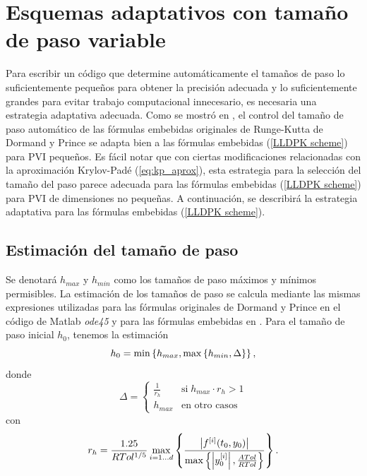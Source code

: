 \section{Esquemas adaptativos con tamaño de paso variable}
Para escribir un código que determine automáticamente el tamaños de paso lo suficientemente pequeños para obtener la precisión adecuada y lo suficientemente grandes para evitar trabajo computacional innecesario, es necesaria una estrategia adaptativa adecuada. Como se mostró en \cite{Jimenez14AMC}, el control del tamaño de paso automático de las fórmulas embebidas originales de Runge-Kutta de Dormand y Prince se adapta bien a las fórmulas embebidas (\ref{LLDPK scheme}) para PVI pequeños. Es fácil notar que con ciertas modificaciones relacionadas con la aproximación Krylov-Padé (\ref{eq:kp_aprox}), esta estrategia para la selección del tamaño del paso parece adecuada para las fórmulas embebidas (\ref{LLDPK scheme}) para PVI de dimensiones no pequeñas. A continuación, se describirá la estrategia adaptativa para las fórmulas embebidas (\ref{LLDPK scheme}).

\subsection{Estimación del tamaño de paso}\label{secc:stepsizes}
Se denotará $h_{max}$ y $h_{min}$ como los tamaños de paso máximos y mínimos permisibles. La estimación de los tamaños de paso se calcula mediante las mismas expresiones utilizadas para las fórmulas originales de Dormand y Prince en el código de Matlab \textit{ode45} \cite{shampine1997matlab} y para las fórmulas embebidas en \cite{Jimenez14AMC}. Para el tamaño de paso inicial $h_0$, tenemos la estimación
\begin{equation}
    h_0 = \min\left\{  h_{max}, \max\left\{  h_{min} ,\Delta \right\}  \right\}, \label{hcero}
\end{equation}
donde
\begin{equation*}
    \Delta = \begin{cases}
        \frac{1}{r_h} & \text{si} \; h_{max}\cdot r_h>1\\
        h_{max} & \text{en otro casos}
        \end{cases}
\end{equation*}
con
\begin{equation*}
     r_h = \frac{1\mathord{.}25}{RTol^{1/5}}\max_{i=1\ldots d}\left\{\frac{ \left\lvert f^{[i]}(t_0,y_0) \right\rvert }
    {\max\left\{ \left\lvert y^{[i]}_0 \right\rvert ,\frac{ATol}{RTol} \right\}}\right\}.
\end{equation*}

